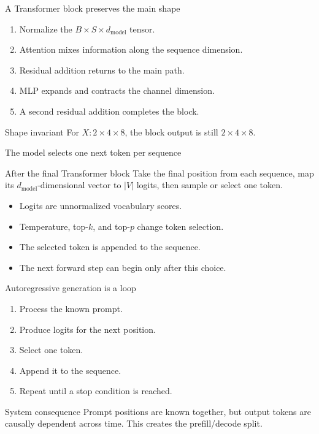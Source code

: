 \documentclass[aspectratio=169,11pt]{beamer}
\begin{document}
\begin{frame}{A Transformer block preserves the main shape}
  \begin{enumerate}
    \item Normalize the \(B\times S\times d_{\text{model}}\) tensor.
    \item Attention mixes information along the sequence dimension.
    \item Residual addition returns to the main path.
    \item MLP expands and contracts the channel dimension.
    \item A second residual addition completes the block.
  \end{enumerate}
  \vspace{0.28cm}
  \begin{block}{Shape invariant}
    For \(X:2\times4\times8\), the block output is still \(2\times4\times8\).
  \end{block}
\end{frame}

\begin{frame}{The model selects one next token per sequence}
  \begin{block}{After the final Transformer block}
    Take the final position from each sequence, map its \(d_{\text{model}}\)-dimensional vector to \(|V|\) logits, then sample or select one token.
  \end{block}
  \begin{itemize}
    \item Logits are unnormalized vocabulary scores.
    \item Temperature, top-\(k\), and top-\(p\) change token selection.
    \item The selected token is appended to the sequence.
    \item The next forward step can begin only after this choice.
  \end{itemize}
\end{frame}

\begin{frame}{Autoregressive generation is a loop}
  \begin{enumerate}
    \item Process the known prompt.
    \item Produce logits for the next position.
    \item Select one token.
    \item Append it to the sequence.
    \item Repeat until a stop condition is reached.
  \end{enumerate}
  \vspace{0.3cm}
  \begin{block}{System consequence}
    Prompt positions are known together, but output tokens are causally dependent across time. This creates the prefill/decode split.
  \end{block}
\end{frame}
\end{document}
